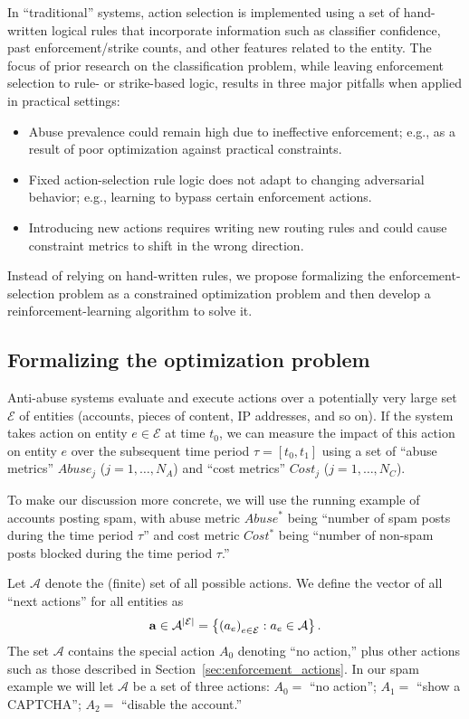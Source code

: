In ``traditional'' systems, action selection is implemented using a set of hand-written logical rules that incorporate information such as classifier confidence, past enforcement/strike counts, and other features related to the entity. The focus of prior research on the classification problem, while leaving enforcement selection to rule- or strike-based logic, results in three major pitfalls when applied in practical settings:
\begin{itemize}
\squeezelist
    \item Abuse prevalence could remain high due to ineffective enforcement; e.g., as a result of poor optimization against practical constraints.
    \item Fixed action-selection rule logic does not adapt to changing adversarial behavior; e.g., learning to bypass certain enforcement actions.
   \item Introducing new actions requires writing new routing rules and could cause constraint metrics to shift in the wrong direction.
\end{itemize}

Instead of relying on hand-written rules, we propose formalizing the enforcement-selection problem as a constrained optimization problem and then develop a reinforcement-learning algorithm to solve it.

\subsection{Formalizing the optimization problem}\label{sec:problem_math}

Anti-abuse systems evaluate and execute actions over a potentially very large set $\mathcal{E}$ of entities (\osn accounts, pieces of content, IP addresses, and so on). If the system takes action on entity $e \in \mathcal{E}$ at time $t_0$, we can measure the impact of this action on entity $e$ over the subsequent time period $\tau = [t_0, t_1]$ using a set of ``abuse metrics'' $Abuse_{j}$ ($j  = 1, \dots, N_A$) and ``cost metrics'' $Cost_{j}$ ($j = 1,  \dots, N_C$). 

To make our discussion more concrete, we will use the running example of \osn accounts posting spam, with abuse metric $Abuse^*$ being ``number of spam posts during the time period $\tau$'' and cost metric $Cost^*$ being ``number of non-spam posts blocked during the time period $\tau$.'' 

Let $\mathcal{A}$ denote the (finite) set of all possible actions. We define the vector of all ``next actions'' for all entities as  
\begin{equation}\label{eq:action_set}
\mathbf{a} \in \mathcal{A}^{\left|\mathcal{E}\right|} = \left\{ \left(a_e\right)_{ e\in\mathcal{E}}:  a_e \in \mathcal{A} \right\} .
\end{equation}
The set $\mathcal{A}$ contains the special action $A_0$ denoting ``no action,'' plus other actions such as those described in Section~\ref{sec:enforcement_actions}. In our spam example we will let $\mathcal{A}$ be a set of three actions: $A_0 = $ ``no action''; $A_1 = $ ``show a CAPTCHA''; $A_2 = $ ``disable the account.''

